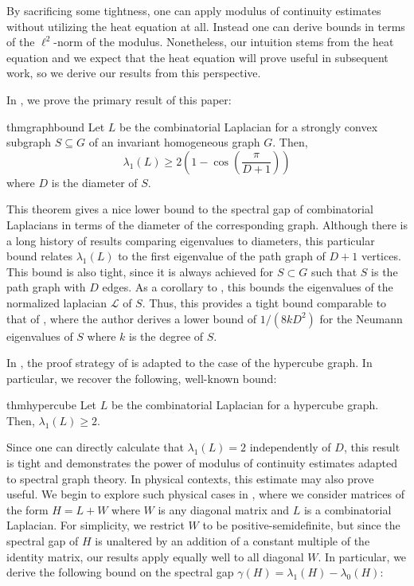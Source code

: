 By sacrificing some tightness, one can apply modulus of continuity estimates without utilizing the heat equation at all. Instead one can derive bounds in terms of the $\ell^2$-norm of the modulus. Nonetheless, our intuition stems from the heat equation and we expect that the heat equation will prove useful in subsequent work, so we derive our results from this perspective.

In , we prove the primary result of this paper: 

\begin{restatable}{thm}{graphbound}\label{thm:bound}
 Let $L$ be the combinatorial Laplacian for a strongly convex subgraph $S\subseteq G$ of an invariant homogeneous graph $G$. Then,
 \begin{equation*}
  \lambda_1(L) \geq 2 \left(1 - \cos\left(\frac{\pi}{D+1} \right)\right)
 \end{equation*}
 where $D$ is the diameter of $S$.
\end{restatable}

This theorem gives a nice lower bound to the spectral gap of combinatorial Laplacians in terms of the diameter of the corresponding graph. Although there is a long history of results comparing eigenvalues to diameters, this particular bound relates $\lambda_1(L)$ to the first eigenvalue of the path graph of $D+1$ vertices. This bound is also tight, since it is always achieved for $S \subset G$ such that $S$ is the path graph with $D$ edges. As a corollary to , this bounds the eigenvalues of the normalized laplacian $\mathcal{L}$ of $S$. Thus, this provides a tight bound comparable to that of \cite{Chung1994}, where the author derives a lower bound of $1/(8k D^2)$ for the Neumann eigenvalues of $S$ where $k$ is the degree of $S$.

 In , the proof strategy of  is adapted to the case of the hypercube graph. In particular, we recover the following, well-known bound:
 
\begin{restatable}{thm}{hypercube}\label{thm:hypercube}
	Let $L$ be the combinatorial Laplacian for a hypercube graph. Then, $\lambda_1(L) \geq 2$.
\end{restatable} 

 Since one can directly calculate that $\lambda_1(L)=2$ independently of $D$, this result is tight and demonstrates the power of modulus of continuity estimates adapted to spectral graph theory. In physical contexts, this estimate may also prove useful. We begin to explore such physical cases in , where we consider matrices of the form $H=L+W$ where $W$ is any diagonal matrix and $L$ is a combinatorial Laplacian. For simplicity, we restrict $W$ to be positive-semidefinite, but since the spectral gap of $H$ is unaltered by an addition of a constant multiple of the identity matrix, our results apply equally well to all diagonal $W$. In particular, we derive the following bound on the spectral gap $\gamma(H) = \lambda_1(H)-\lambda_0(H)$:

